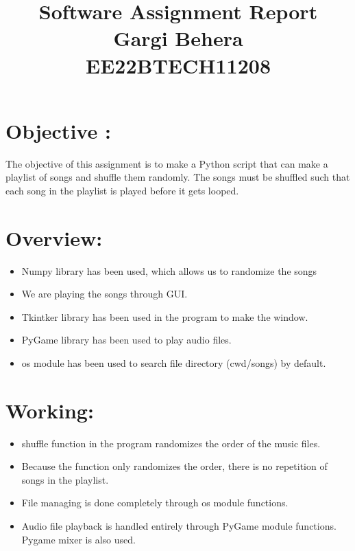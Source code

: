 \documentclass{article}
\begin{document}
\title{Software Assignment Report\\ \large{Gargi Behera\\EE22BTECH11208}}
\author{}
\date{}
\maketitle

\maketitle

\section*{Objective :}
The objective of this assignment is to make a Python script that can make a playlist of songs and shuffle them randomly. The songs must be shuffled such that each song in the playlist is played before it gets looped.

\section*{Overview:}
\begin{itemize}
    \item Numpy library has been used, which allows us to randomize the songs
    \item We are playing the songs through GUI.
    \item Tkintker library has been used in the program to make the window.
    \item PyGame library has been used to play audio files.
    \item os module has been used to search file directory (cwd/songs) by default.
\end{itemize}




\section*{Working:}
\begin{itemize}
    \item shuffle function in the program randomizes the order of the music files.
    \item Because the function only randomizes the order, there is no repetition of songs in the playlist.
    \item File managing is done completely through os module functions.
    \item Audio file playback is handled entirely through PyGame module functions. Pygame mixer is also used.
\end{itemize}
\end{document}
